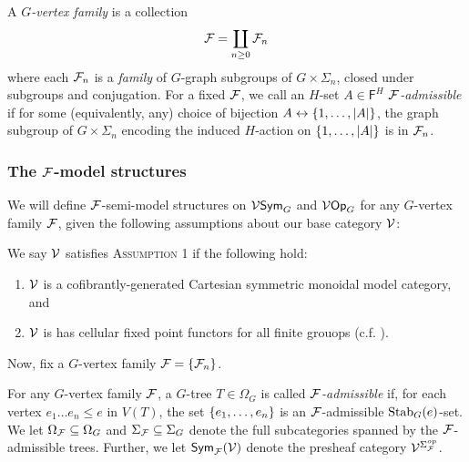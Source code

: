 \documentclass[a4paper,10pt]{article}%
\begin{document}
\begin{definition} 
 A \textit{$G$-vertex family} is a collection 
\[ 
\mathcal F = \coprod\limits_{n\geq 0}\mathcal F_n 
\] 
where each $\mathcal F_n$ is a \textit{family} of $G$-graph subgroups of $G\times \Sigma_n$, closed under subgroups and conjugation. For a fixed $\mathcal F$, we call an $H$-set $A\in \mathsf F^H$ \textit{$\mathcal F$-admissible} if for some (equivalently, any) choice of bijection $A \leftrightarrow \left\{1,\ldots, |A|\right\}$, the graph subgroup of $G\times \Sigma_n$ encoding the induced $H$-action on $\left\{1,\ldots, |A|\right\}$ is in $\mathcal F_n$.  
\end{definition} 

\subsubsection{The $\mathcal F$-model structures}

We will define $\mathcal F$-semi-model structures on $\mathcal V\mathsf{Sym}_G$ and $\mathcal V\mathsf{Op}_G$ for any $G$-vertex family $\mathcal F$, given the following assumptions about our base category $\mathcal V$: 

\begin{definition} 
 We say $\mathcal V$ satisfies \textsc{Assumption 1} if the following hold: 
\begin{enumerate} 
	\item $\mathcal V$ is a cofibrantly-generated Cartesian symmetric monoidal model category, and 
	\item $\mathcal V$ is has cellular fixed point functors for all finite grouops %
(c.f. \cite{Ste16}).
\end{enumerate} 
\end{definition} 

Now, fix a $G$-vertex family $\mathcal F = \left\{\mathcal F_n\right\}$.  

\begin{definition} 
 For any $G$-vertex family $\mathcal F$, a $G$-tree $T\in \Omega_G$ is called \textit{$\mathcal F$-admissible} if, for each vertex $e_1\ldots e_n \leq e$ in $V(T)$, the set $\left\{e_1,\ldots, e_n\right\}$ is an $\mathcal F$-admissible $\mathrm{Stab}_G(e)$-set. We let $\Omega_{\mathcal F}\subseteq \Omega_G$ and $\Sigma_{\mathcal F}\subseteq \Sigma_G$ denote the full subcategories spanned by the $\mathcal F$-admissible trees. Further, we let $\mathsf{Sym}_{\mathcal F}(\mathcal V)$ denote the presheaf category $\mathcal V^{\Sigma_{\mathcal F}^{op}}$.
\end{definition} 
\end{document}
